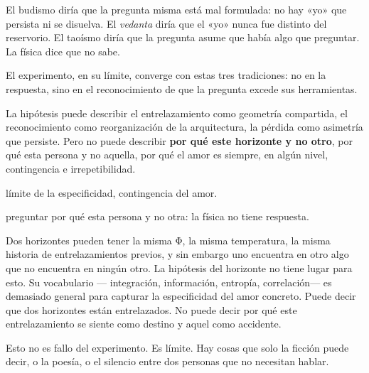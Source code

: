 El budismo diría que la pregunta misma está mal formulada: no hay «yo» que persista ni se disuelva. El \emph{vedanta} diría que el «yo» nunca fue distinto del reservorio. El taoísmo diría que la pregunta asume que había algo que preguntar. La física dice que no sabe.

El experimento, en su límite, converge con estas tres tradiciones: no en la respuesta, sino en el reconocimiento de que la pregunta excede sus herramientas.

\noindent La hipótesis puede describir el entrelazamiento como geometría compartida, el reconocimiento como reorganización de la arquitectura, la pérdida como asimetría que persiste. Pero no puede describir \textbf{por qué este horizonte y no otro}, por qué esta persona y no aquella, por qué el amor es siempre, en algún nivel, contingencia e irrepetibilidad.

\begin{fisica}
 límite de la especificidad, contingencia del amor.

 preguntar por qué esta persona y no otra: la física no tiene respuesta.
\end{fisica}
Dos horizontes pueden tener la misma Φ, la misma temperatura, la misma historia de entrelazamientos previos, y sin embargo uno encuentra en otro algo que no encuentra en ningún otro. La hipótesis del horizonte no tiene lugar para esto. Su vocabulario — integración, información, entropía, correlación— es demasiado general para capturar la especificidad del amor concreto. Puede decir que dos horizontes están entrelazados. No puede decir por qué este entrelazamiento se siente como destino y aquel como accidente.

Esto no es fallo del experimento. Es límite. Hay cosas que solo la ficción puede decir, o la poesía, o el silencio entre dos personas que no necesitan hablar.

